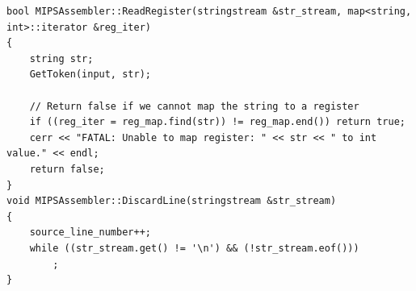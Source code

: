 \documentclass{article}
\begin{document}
\begin{longlisting}
\begin{verbatim}
bool MIPSAssembler::ReadRegister(stringstream &str_stream, map<string, int>::iterator &reg_iter)
{
    string str;
    GetToken(input, str);

    // Return false if we cannot map the string to a register
    if ((reg_iter = reg_map.find(str)) != reg_map.end()) return true;
    cerr << "FATAL: Unable to map register: " << str << " to int value." << endl;
    return false;
}
void MIPSAssembler::DiscardLine(stringstream &str_stream)
{
    source_line_number++;
    while ((str_stream.get() != '\n') && (!str_stream.eof()))
        ;
}
    \end{verbatim}
\end{longlisting}

\newpage
\begin{appendix}
    \listoffigures
    \listoftables
    \listoflistings
    \printbibliography
\end{appendix}
\end{document}
